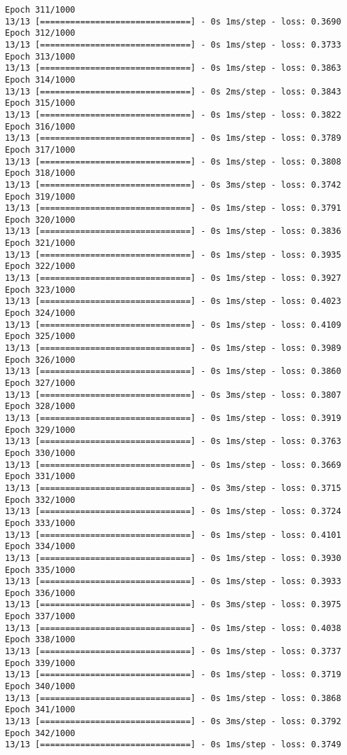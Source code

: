 \documentclass[11pt]{article}
\begin{document}
\begin{Verbatim}[commandchars=\\\{\}]
Epoch 311/1000
13/13 [==============================] - 0s 1ms/step - loss: 0.3690
Epoch 312/1000
13/13 [==============================] - 0s 1ms/step - loss: 0.3733
Epoch 313/1000
13/13 [==============================] - 0s 1ms/step - loss: 0.3863
Epoch 314/1000
13/13 [==============================] - 0s 2ms/step - loss: 0.3843
Epoch 315/1000
13/13 [==============================] - 0s 1ms/step - loss: 0.3822
Epoch 316/1000
13/13 [==============================] - 0s 1ms/step - loss: 0.3789
Epoch 317/1000
13/13 [==============================] - 0s 1ms/step - loss: 0.3808
Epoch 318/1000
13/13 [==============================] - 0s 3ms/step - loss: 0.3742
Epoch 319/1000
13/13 [==============================] - 0s 1ms/step - loss: 0.3791
Epoch 320/1000
13/13 [==============================] - 0s 1ms/step - loss: 0.3836
Epoch 321/1000
13/13 [==============================] - 0s 1ms/step - loss: 0.3935
Epoch 322/1000
13/13 [==============================] - 0s 1ms/step - loss: 0.3927
Epoch 323/1000
13/13 [==============================] - 0s 1ms/step - loss: 0.4023
Epoch 324/1000
13/13 [==============================] - 0s 1ms/step - loss: 0.4109
Epoch 325/1000
13/13 [==============================] - 0s 1ms/step - loss: 0.3989
Epoch 326/1000
13/13 [==============================] - 0s 1ms/step - loss: 0.3860
Epoch 327/1000
13/13 [==============================] - 0s 3ms/step - loss: 0.3807
Epoch 328/1000
13/13 [==============================] - 0s 1ms/step - loss: 0.3919
Epoch 329/1000
13/13 [==============================] - 0s 1ms/step - loss: 0.3763
Epoch 330/1000
13/13 [==============================] - 0s 1ms/step - loss: 0.3669
Epoch 331/1000
13/13 [==============================] - 0s 3ms/step - loss: 0.3715
Epoch 332/1000
13/13 [==============================] - 0s 1ms/step - loss: 0.3724
Epoch 333/1000
13/13 [==============================] - 0s 1ms/step - loss: 0.4101
Epoch 334/1000
13/13 [==============================] - 0s 1ms/step - loss: 0.3930
Epoch 335/1000
13/13 [==============================] - 0s 1ms/step - loss: 0.3933
Epoch 336/1000
13/13 [==============================] - 0s 3ms/step - loss: 0.3975
Epoch 337/1000
13/13 [==============================] - 0s 1ms/step - loss: 0.4038
Epoch 338/1000
13/13 [==============================] - 0s 1ms/step - loss: 0.3737
Epoch 339/1000
13/13 [==============================] - 0s 1ms/step - loss: 0.3719
Epoch 340/1000
13/13 [==============================] - 0s 1ms/step - loss: 0.3868
Epoch 341/1000
13/13 [==============================] - 0s 3ms/step - loss: 0.3792
Epoch 342/1000
13/13 [==============================] - 0s 1ms/step - loss: 0.3749

\end{Verbatim}
\end{document}
